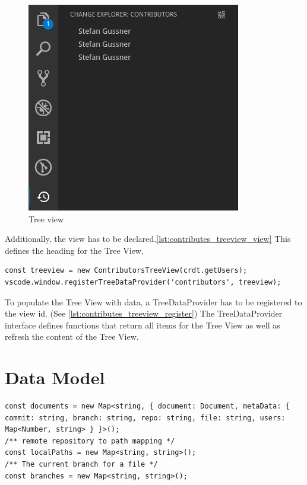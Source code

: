 \begin{figure}[hb]
    \centering
    \includegraphics{figures/screenshots/treeview.png}
    \caption{Tree view}
    \label{fig:treeview}
\end{figure}

Additionally, the view has to be declared.\autoref{lst:contributes_treeview_view} This defines the heading for the Tree View.

\begin{lstlisting}[label={lst:contributes_treeview_register}, caption=Define Tree View Data Provider]
const treeview = new ContributorsTreeView(crdt.getUsers);
vscode.window.registerTreeDataProvider('contributors', treeview);
\end{lstlisting}

To populate the Tree View with data, a TreeDataProvider has to be registered to the view id. (See \autoref{lst:contributes_treeview_register})
The TreeDataProvider interface defines functions that return all items for the Tree View as well as refresh the content of the Tree View.

\section{Data Model}

\begin{lstlisting}[label={lst:datamodel_declarations}, caption=Data Model Declarations]
const documents = new Map<string, { document: Document, metaData: { commit: string, branch: string, repo: string, file: string, users: Map<Number, string> } }>();
/** remote repository to path mapping */
const localPaths = new Map<string, string>();
/** The current branch for a file */
const branches = new Map<string, string>();
\end{lstlisting}

